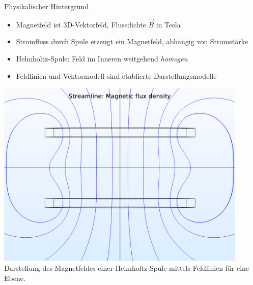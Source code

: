 \begin{frame}[fragile]{Physikalischer Hintergrund}
\begin{minipage}{0.5\textwidth}
	{
		\begin{itemize}[itemsep=1mm]
			\item Magnetfeld ist 3D-Vektorfeld, Flussdichte $\vec{B}$ in Tesla
			\item Stromfluss durch Spule erzeugt ein Magnetfeld, abhängig von Stromstärke
			\item Helmholtz-Spule: Feld im Inneren weitgehend \textit{homogen}
			\item Feldlinien und Vektormodell sind etablierte Darstellungsmodelle
		\end{itemize}
	}
\end{minipage}
\begin{minipage}{0.45\textwidth}
	\centering
	\includegraphics[width=0.9\textwidth]{images/papers/hh_mfield_nocol.png}\\
	\small Darstellung des Magnetfeldes einer Helmholtz-Spule mittels Feldlinien für eine Ebene.
\end{minipage}
\end{frame}

